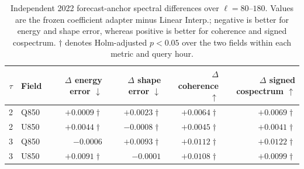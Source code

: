 \begin{table}[!htbp]
\caption{Independent 2022 forecast-anchor spectral differences over
$\ell=80$--$180$. Values are the frozen coefficient adapter minus Linear Interp.;
negative is better for energy and shape error, whereas positive is better for
coherence and signed cospectrum. $\dagger$ denotes Holm-adjusted $p<0.05$
over the two fields within each metric and query hour.}
\label{tab:supp_nwp_spectra_2022}
\centering
\small
\setlength{\tabcolsep}{4pt}
\begin{tabular}{clrrrr}
\toprule
$\tau$ & Field & $\Delta$ energy error $\downarrow$ &
$\Delta$ shape error $\downarrow$ & $\Delta$ coherence $\uparrow$ &
$\Delta$ signed cospectrum $\uparrow$ \\
\midrule
2 & Q850 & $+0.0009\dagger$ & $+0.0023\dagger$ & $+0.0064\dagger$ & $+0.0069\dagger$ \\
2 & U850 & $+0.0044\dagger$ & $-0.0008\dagger$ & $+0.0045\dagger$ & $+0.0041\dagger$ \\
3 & Q850 & $-0.0006$ & $+0.0093\dagger$ & $+0.0112\dagger$ & $+0.0122\dagger$ \\
3 & U850 & $+0.0091\dagger$ & $-0.0001$ & $+0.0108\dagger$ & $+0.0099\dagger$ \\
\bottomrule
\end{tabular}
\end{table}
